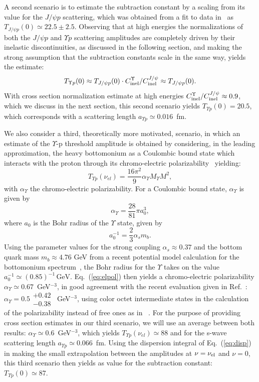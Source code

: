 \documentclass[prd,amsmath,%
twocolumn,floatfix,amssymb, preprintnumbers, linenumbers,nofootinbib, superscriptaddress]{revtex4}
\newcommand{\beq}{\begin{equation}}
\newcommand{\eeq}{\end{equation}}
\begin{document}
A second scenario is to estimate the subtraction constant by a scaling from its value for the $J/\psi p$ scattering, which was obtained from a fit to data in~\cite{Gryniuk:2016mpk} as $T_{J/\psi p }(0) \simeq 22.5 \pm 2.5$. 
Observing that at high energies the normalizations of both the $J/\psi p$ and $\Upsilon p$ scattering amplitudes are completely driven by their inelastic discontinuities, as discussed in the following section, and making the strong assumption that the subtraction constants scale in the same way, yields the estimate: 
\beq
T_{\Upsilon p}(0) \approx T_{J/\psi p }(0) \cdot C_{\rm inel}^\Upsilon / C_{\rm inel}^{J/\psi} \approx T_{J/\psi p }(0).
\eeq
With cross section normalization estimate 
at high energies  
$C_{\rm inel}^\Upsilon / C_{\rm inel}^{J/\psi} \approx 0.9$, which we discuss in the next section, this second scenario yields $T_{\Upsilon p}(0) = 20.5$, which corresponds with a scattering length $a_{\Upsilon p} \simeq 0.016$~fm. 

We also consider a third, theoretically more motivated, scenario, in which an estimate of the $\Upsilon$-p threshold amplitude is obtained by considering, in the leading approximation,  the heavy bottomonium 
as a Coulombic bound state which interacts with the proton through its chromo-electric polarizability~\cite{Peskin:1979va} yielding:
\beq
T_{\Upsilon p}(\nu_{el}) = \frac{16\pi^2}{9} \alpha_\Upsilon M_{\Upsilon} M^2,
\eeq
with $\alpha_\Upsilon$ the chromo-electric polarizability.  
For a Coulombic bound state, $\alpha_\Upsilon$ is given by~\cite{Peskin:1979va,Bhanot:1979vb}
\beq
\alpha_\Upsilon = \frac{28}{81} \pi a_0^3,
\label{eq:elpol}
\eeq
where $a_0$ is the Bohr radius of the $\Upsilon$ state, given by
\beq
a_0^{-1} = \frac{2}{3}\alpha_s m_b.
\eeq
Using the parameter values for the strong coupling $\alpha_s\approx 0.37$ and the bottom quark mass $m_b\approx 4.76$ GeV from a recent potential model calculation for the bottomonium spectrum~\cite{Deng:2016ktl}, the Bohr radius for the $\Upsilon$ takes on the value
$a_0^{-1} \simeq (0.85)^{-1} \,\mathrm{GeV}$. 
Eq.~(\ref{eq:elpol}) then yields a chromo-electric polarizability $\alpha_\Upsilon \simeq 0.67$~GeV$^{-3}$, in good agreement with the recent evaluation given in Ref.~\cite{Brambilla:2015rqa}: 
$\alpha_\Upsilon = 0.5 \substack{+0.42 \\ -0.38}$~GeV$^{-3}$, using color octet intermediate states in the calculation of the polarizability instead of free ones as in ~\cite{Peskin:1979va,Bhanot:1979vb}. For the purpose of providing cross section estimates in our third scenario, we will use an average between both results: $\alpha_\Upsilon \simeq 0.6$~GeV$^{-3}$, 
which yields $T_{\Upsilon p}(\nu_{el}) \simeq 88$ and for the s-wave scattering length $a_{\Upsilon p} \simeq 0.066$~fm. Using the dispersion integral of Eq.~(\ref{eq:disp}) in making the small extrapolation between the amplitudes at $\nu = \nu_{\rm el}$ and $\nu = 0$, this third scenario then yields as value for the subtraction constant: $T_{\Upsilon p}(0) \simeq 87$. 
\end{document}
